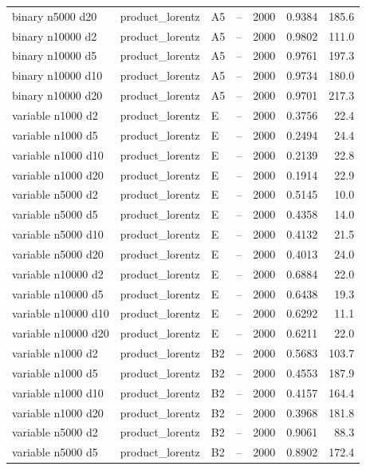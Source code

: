 \begin{longtable}{llllrrr}
binary n5000 d20 & product\_lorentz & A5 & -- & 2000 & 0.9384 & 185.6 \\
binary n10000 d2 & product\_lorentz & A5 & -- & 2000 & 0.9802 & 111.0 \\
binary n10000 d5 & product\_lorentz & A5 & -- & 2000 & 0.9761 & 197.3 \\
binary n10000 d10 & product\_lorentz & A5 & -- & 2000 & 0.9734 & 180.0 \\
binary n10000 d20 & product\_lorentz & A5 & -- & 2000 & 0.9701 & 217.3 \\
variable n1000 d2 & product\_lorentz & E & -- & 2000 & 0.3756 & 22.4 \\
variable n1000 d5 & product\_lorentz & E & -- & 2000 & 0.2494 & 24.4 \\
variable n1000 d10 & product\_lorentz & E & -- & 2000 & 0.2139 & 22.8 \\
variable n1000 d20 & product\_lorentz & E & -- & 2000 & 0.1914 & 22.9 \\
variable n5000 d2 & product\_lorentz & E & -- & 2000 & 0.5145 & 10.0 \\
variable n5000 d5 & product\_lorentz & E & -- & 2000 & 0.4358 & 14.0 \\
variable n5000 d10 & product\_lorentz & E & -- & 2000 & 0.4132 & 21.5 \\
variable n5000 d20 & product\_lorentz & E & -- & 2000 & 0.4013 & 24.0 \\
variable n10000 d2 & product\_lorentz & E & -- & 2000 & 0.6884 & 22.0 \\
variable n10000 d5 & product\_lorentz & E & -- & 2000 & 0.6438 & 19.3 \\
variable n10000 d10 & product\_lorentz & E & -- & 2000 & 0.6292 & 11.1 \\
variable n10000 d20 & product\_lorentz & E & -- & 2000 & 0.6211 & 22.0 \\
variable n1000 d2 & product\_lorentz & B2 & -- & 2000 & 0.5683 & 103.7 \\
variable n1000 d5 & product\_lorentz & B2 & -- & 2000 & 0.4553 & 187.9 \\
variable n1000 d10 & product\_lorentz & B2 & -- & 2000 & 0.4157 & 164.4 \\
variable n1000 d20 & product\_lorentz & B2 & -- & 2000 & 0.3968 & 181.8 \\
variable n5000 d2 & product\_lorentz & B2 & -- & 2000 & 0.9061 & 88.3 \\
variable n5000 d5 & product\_lorentz & B2 & -- & 2000 & 0.8902 & 172.4 \\

\end{longtable}
